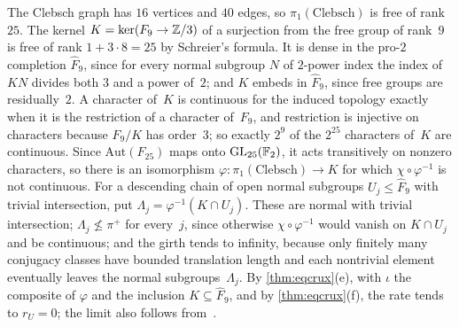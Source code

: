\begin{informalproof}
The Clebsch graph has $16$ vertices and $40$ edges, so $\pi_1(\mathrm{Clebsch})$ is free of rank~$25$. The kernel
$K=\ker(F_9\to\mathbb{Z}/3)$ of a surjection from the free group of rank~$9$ is free of rank $1+3\cdot8=25$ by Schreier's formula. It is
dense in the pro-$2$ completion $\hat F_9$, since for every normal subgroup $N$ of $2$-power index the index of $KN$ divides both
$3$ and a power of~$2$; and $K$ embeds in $\hat F_9$, since free groups are residually~$2$. A character of~$K$ is continuous for
the induced topology exactly when it is the restriction of a character of~$F_9$, and restriction is injective on characters
because $F_9/K$ has order~$3$; so exactly $2^9$ of the $2^{25}$ characters of~$K$ are continuous. Since $\mathrm{Aut}(F_{25})$
maps onto $\mathrm{GL}_{25}(\mathbb{F}_2)$, it acts transitively on nonzero characters, so there is an isomorphism
$\varphi\colon\pi_1(\mathrm{Clebsch})\to K$ for which $\chi\circ\varphi^{-1}$ is not continuous. For a descending chain of open
normal subgroups $U_j\le\hat F_9$ with trivial intersection, put $\Lambda_j=\varphi^{-1}(K\cap U_j)$. These are normal with
trivial intersection; $\Lambda_j\not\le\pi^+$ for every~$j$, since otherwise $\chi\circ\varphi^{-1}$ would vanish on $K\cap U_j$
and be continuous; and the girth tends to infinity, because only finitely many conjugacy classes have bounded translation
length and each nontrivial element eventually leaves the normal subgroups~$\Lambda_j$. By \cref{thm:eqcrux}(e), with $\iota$ the
composite of $\varphi$ and the inclusion $K\subseteq\hat F_9$, and by \cref{thm:eqcrux}(f), the rate tends to $r_U=0$; the limit
also follows from~\cite[Theorem~6.2]{Covers2026}.
\end{informalproof}

